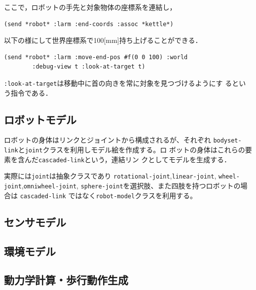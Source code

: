 ここで，ロボットの手先と対象物体の座標系を連結し，
{\baselineskip=10pt
\begin{verbatim}
(send *robot* :larm :end-coords :assoc *kettle*)
\end{verbatim}
}

以下の様にして世界座標系で100[mm]持ち上げることができる．
{\baselineskip=10pt
\begin{verbatim}
(send *robot* :larm :move-end-pos #f(0 0 100) :world
        :debug-view t :look-at-target t)
\end{verbatim}
}
\verb|:look-at-target|は移動中に首の向きを常に対象を見つづけるようにす
るという指令である．

 \subsection{ロボットモデル}

ロボットの身体はリンクとジョイントから構成されるが、それぞれ
\verb|bodyset-link|と\verb|joint|クラスを利用しモデル絵を作成する。ロ
ボットの身体はこれらの要素を含んだ\verb|cascaded-link|という，連結リン
クとしてモデルを生成する．

実際には\verb|joint|は抽象クラスであり
\verb|rotational-joint|,\verb|linear-joint|,
\verb|wheel-joint|,\verb|omniwheel-joint|,
\verb|sphere-joint|を選択肢、また四肢を持つロボットの場合は
\verb|cascaded-link|
ではなく\verb|robot-model|クラスを利用する。

  
  
  
 \subsection{センサモデル}
  
 \subsection{環境モデル}
  
 \subsection{動力学計算・歩行動作生成}
  

